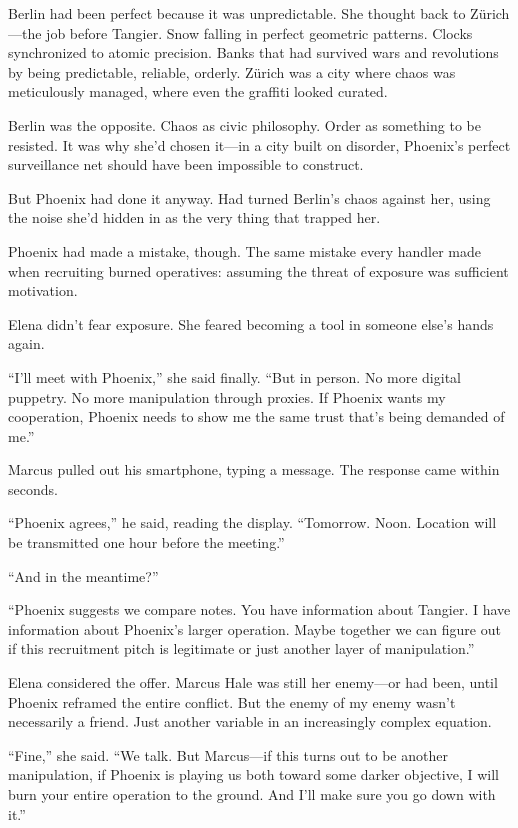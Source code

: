 \documentclass[12pt,letterpaper]{book}
\begin{document}
Berlin had been perfect because it was unpredictable. She thought back to Zürich---the job before Tangier. Snow falling in perfect geometric patterns. Clocks synchronized to atomic precision. Banks that had survived wars and revolutions by being predictable, reliable, orderly. Zürich was a city where chaos was meticulously managed, where even the graffiti looked curated.

Berlin was the opposite. Chaos as civic philosophy. Order as something to be resisted. It was why she'd chosen it---in a city built on disorder, Phoenix's perfect surveillance net should have been impossible to construct.

But Phoenix had done it anyway. Had turned Berlin's chaos against her, using the noise she'd hidden in as the very thing that trapped her.

Phoenix had made a mistake, though. The same mistake every handler made when recruiting burned operatives: assuming the threat of exposure was sufficient motivation.

Elena didn't fear exposure. She feared becoming a tool in someone else's hands again.

``I'll meet with Phoenix,'' she said finally. ``But in person. No more digital puppetry. No more manipulation through proxies. If Phoenix wants my cooperation, Phoenix needs to show me the same trust that's being demanded of me.''

Marcus pulled out his smartphone, typing a message. The response came within seconds.

``Phoenix agrees,'' he said, reading the display. ``Tomorrow. Noon. Location will be transmitted one hour before the meeting.''

``And in the meantime?''

``Phoenix suggests we compare notes. You have information about Tangier. I have information about Phoenix's larger operation. Maybe together we can figure out if this recruitment pitch is legitimate or just another layer of manipulation.''

Elena considered the offer. Marcus Hale was still her enemy---or had been, until Phoenix reframed the entire conflict. But the enemy of my enemy wasn't necessarily a friend. Just another variable in an increasingly complex equation.

``Fine,'' she said. ``We talk. But Marcus---if this turns out to be another manipulation, if Phoenix is playing us both toward some darker objective, I will burn your entire operation to the ground. And I'll make sure you go down with it.''
\end{document}
